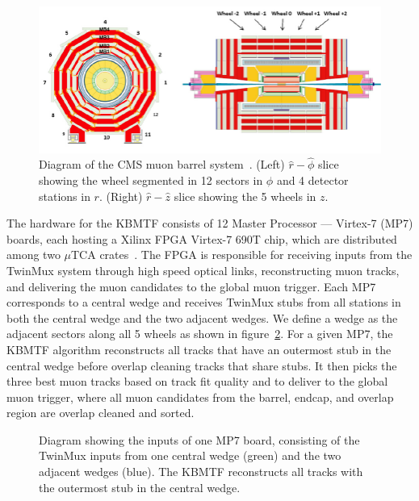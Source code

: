 \begin{figure}[htb!]
	\centering
	\includegraphics[width=.85\linewidth]{figs/04_muons/muon_barrel.png}
	\caption[Diagram of the CMS muon barrel system~\cite{Chatrchyan_2010}. (Left) $\hat{r}-\hat{\phi}$ slice showing the wheel segmented in 12 sectors in $\phi$ and 4 detector stations in $r$. (Right) $\hat{r}-\hat{z}$ slice showing the 5 wheels in $z$.]{Diagram of the CMS muon barrel system~\cite{Chatrchyan_2010}. (Left) $\hat{r}-\hat{\phi}$ slice showing the wheel segmented in 12 sectors in $\phi$ and 4 detector stations in $r$. (Right) $\hat{r}-\hat{z}$ slice showing the 5 wheels in $z$.}
	\label{fig:mu_barrel}
\end{figure}

The hardware for the KBMTF consists of 12 Master Processor --- Virtex-7 (MP7) boards, each hosting a Xilinx FPGA Virtex-7 690T chip, which are distributed among two $\mu$TCA crates~\cite{bmtf_hardware}. The FPGA is responsible for receiving inputs from the TwinMux system through high speed optical links, reconstructing muon tracks, and delivering the muon candidates to the global muon trigger. Each MP7 corresponds to a central wedge and receives TwinMux stubs from all stations in both the central wedge and the two adjacent wedges. We define a wedge as the adjacent sectors along all 5 wheels as shown in figure~\ref{fig:mu_wedge}. For a given MP7, the KBMTF algorithm reconstructs all tracks that have an outermost stub in the central wedge before overlap cleaning tracks that share stubs. It then picks the three best muon tracks based on track fit quality and \pt to deliver to the global muon trigger, where all muon candidates from the barrel, endcap, and overlap region are overlap cleaned and sorted.

\begin{figure}[htb!]
	\centering
	
	\caption[Diagram showing the inputs of one MP7 board, consisting of the TwinMux inputs from one central wedge (green) and the two adjacent wedges (blue). The KBMTF reconstructs all tracks with the outermost stub in the central wedge.]{Diagram showing the inputs of one MP7 board, consisting of the TwinMux inputs from one central wedge (green) and the two adjacent wedges (blue). The KBMTF reconstructs all tracks with the outermost stub in the central wedge.}
	\label{fig:mu_wedge}
\end{figure}

